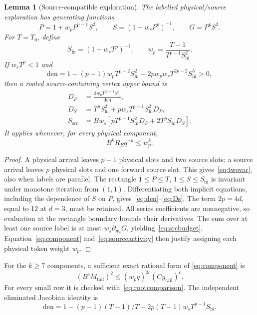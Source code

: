 \documentclass[11pt]{article}
\theoremstyle{plain}
\newtheorem{lemma}{Lemma}
\theoremstyle{remark}
\newcommand{\src}{\mathrm{src}}
\begin{document}
\begin{lemma}[Source-compatible exploration]\label{lem:source}
The labelled physical/source exploration has generating functions
\begin{equation}\label{eq:twovar}
P=1+w_pP^{p-1}S^2,\qquad S=(1-w_sP^p)^{-1},\qquad G=P^pS^2.
\end{equation}
For $T=T_0$, define
\begin{equation}\label{eq:sourceparams}
S_\mathrm{hi}=(1-w_sT^p)^{-1},\qquad
w_p=\frac{T-1}{T^{p-1}S_\mathrm{hi}^2}.
\end{equation}
If $w_sT^p<1$ and
\begin{equation}\label{eq:den}
\mathrm{den}=1-(p-1)w_pT^{p-2}S_\mathrm{hi}^2
-2p w_pw_sT^{2p-2}S_\mathrm{hi}^3>0,
\end{equation}
then a rooted source-containing vertex upper bound is
\begin{align}
D_P&=\frac{2w_pT^{2p-1}S_\mathrm{hi}^3}{\mathrm{den}},\label{eq:Dp}\\
D_S&=T^pS_\mathrm{hi}^2+pw_sT^{p-1}S_\mathrm{hi}^2D_P,\label{eq:Ds}\\
S_\src&=Bw_s[pT^{p-1}S_\mathrm{hi}^2D_P+2T^pS_\mathrm{hi}D_S].\label{eq:srcbudget}
\end{align}
It applies whenever, for every physical component,
\begin{equation}\label{eq:component}
B^kR_Eq^{-k}\le w_p^k.
\end{equation}
\end{lemma}
\begin{proof}
A physical arrival leaves $p-1$ physical slots and two source slots; a source
arrival leaves $p$ physical slots and one forward source slot.
This gives~\eqref{eq:twovar}, also when labels are parallel. The rectangle
$1\le P\le T$, $1\le S\le S_\mathrm{hi}$ is invariant under monotone iteration
from $(1,1)$. Differentiating both implicit equations, including the dependence
of $S$ on $P$, gives~\eqref{eq:den}--\eqref{eq:Ds}.
The term $2p=4d$, equal to 12 at $d=3$, must be retained.
All series coefficients are nonnegative, so evaluation at the rectangle
boundary bounds their derivatives. The sum over at least one source label is
at most $w_s\partial_{w_s}G$, yielding~\eqref{eq:srcbudget}.
Equation~\eqref{eq:component} and~\eqref{eq:sourceactivity} then justify
assigning each physical token weight $w_p$.
\end{proof}

For the $k\ge7$ components, a sufficient exact rational form of
\eqref{eq:component} is
\begin{equation}\label{eq:tailsource}
(B^cM_{\mathrm{tail}})^2
\le(w_pq)^{2c}(Cy_{\mathrm{tail}})^c.
\end{equation}
For every small row it is checked with~\eqref{eq:rootcomparison}.
The independent eliminated Jacobian identity is
\[
\mathrm{den}=1-(p-1)(T-1)/T
-2p(T-1)w_sT^{p-1}S_\mathrm{hi}.
\]
\end{document}
